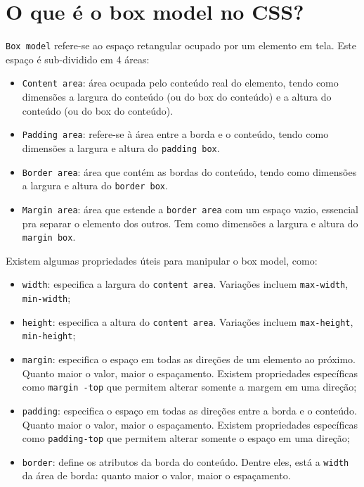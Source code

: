 \section{O que é o box model no CSS?}
\texttt{Box model} refere-se ao espaço retangular ocupado por um elemento em tela. Este espaço é sub-dividido em 4 áreas:
\begin{itemize}
  \item \texttt{Content area}: área ocupada pelo conteúdo real do elemento, tendo como dimensões a largura do conteúdo (ou do box do conteúdo) e a altura do conteúdo (ou do box do conteúdo).
  \item \texttt{Padding area}: refere-se à área entre a borda e o conteúdo, tendo como dimensões a largura e altura do \texttt{padding box}.
  \item \texttt{Border area}: área que contém as bordas do conteúdo, tendo como dimensões a largura e altura do \texttt{border box}.
  \item \texttt{Margin area}: área que estende a \texttt{border area} com um espaço vazio, essencial pra separar o elemento dos outros. Tem como dimensões a largura e altura do \texttt{margin box}.
\end{itemize}

Existem algumas propriedades úteis para manipular o box model, como:
\begin{itemize}
  \item \texttt{width}: especifica a largura do \texttt{content area}. Variações incluem \texttt{max-width}, \texttt{min-width};
  \item \texttt{height}: especifica a altura do \texttt{content area}. Variações incluem \texttt{max-height}, \texttt{min-height};
  \item \texttt{margin}: especifica o espaço em todas as direções de um elemento ao próximo. Quanto maior o valor, maior o espaçamento. Existem propriedades específicas como \texttt{margin -top} que permitem alterar somente a margem em uma direção;
  \item \texttt{padding}: especifica o espaço em todas as direções entre a borda e o conteúdo. Quanto maior o valor, maior o espaçamento. Existem propriedades específicas como \texttt{padding-top} que permitem alterar somente o espaço em uma direção;
  \item \texttt{border}: define os atributos da borda do conteúdo. Dentre eles, está a \texttt{width} da área de borda: quanto maior o valor, maior o espaçamento.
\end{itemize}
